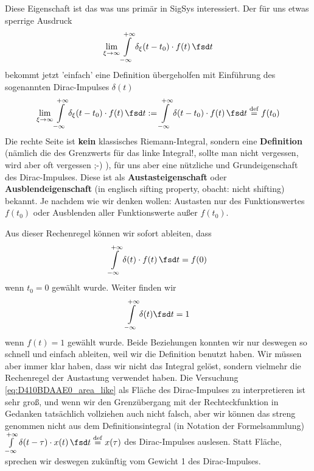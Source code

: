 \begin{Werkzeug}
%
Diese Eigenschaft ist das was uns primär in SigSys interessiert.
%
Der für uns etwas sperrige Ausdruck
\begin{equation}
\lim_{\xi\to\infty} \int\limits_{-\infty}^{+\infty}
\delta_\xi(t-t_0) \cdot f(t) \, \fsd t
\end{equation}
bekommt jetzt 'einfach' eine Definition übergeholfen mit
Einführung des sogenannten Dirac-Impulses $\delta(t)$
\begin{equation}
\label{eq:DiracDistrDef}
\lim_{\xi\to\infty} \int\limits_{-\infty}^{+\infty}
\delta_\xi(t-t_0) \cdot f(t) \, \fsd t
:= \int\limits_{-\infty}^{+\infty} \delta(t-t_0) \cdot f(t) \, \fsd t \stackrel{\mathrm{def}}= f(t_0)
\end{equation}
%
Die rechte Seite ist \textbf{kein} klassisches Riemann-Integral, sondern eine
\textbf{Definition} (nämlich die des Grenzwerts für das linke Integral!,
sollte man nicht vergessen, wird aber oft vergessen ;-) ),
für uns aber eine nützliche  und Grundeigenschaft des
Dirac-Impulses. Diese ist als \textbf{Austasteigenschaft} oder
\textbf{Ausblendeigenschaft} (in englisch sifting property, obacht: nicht shifting)
bekannt. Je nachdem wie wir denken wollen:
Austasten nur des Funktionswertes $f(t_0)$ oder Ausblenden aller Funktionswerte
außer $f(t_0)$.

Aus dieser Rechenregel können wir sofort ableiten, dass
\begin{equation}
\label{}
\int\limits_{-\infty}^{+\infty} \delta(t) \cdot f(t) \, \fsd t = f(0)
\end{equation}
wenn $t_0=0$ gewählt wurde.
%
Weiter finden wir
\begin{equation}
\label{eq:D410BDAAE0_area_like}
\int\limits_{-\infty}^{+\infty} \delta(t) \fsd t = 1
\end{equation}
wenn $f(t)=1$ gewählt wurde.
%
Beide Beziehungen konnten wir nur deswegen so schnell und einfach ableiten, weil
wir die Definition benutzt haben. Wir müssen aber immer klar haben, dass wir
nicht das Integral gelöst, sondern vielmehr die Rechenregel der Austastung
verwendet haben.
%
Die Versuchung \eqref{eq:D410BDAAE0_area_like} als Fläche
des Dirac-Impulses zu interpretieren
ist sehr groß, und wenn wir den Grenzübergang mit der Rechteckfunktion in Gedanken
tatsächlich vollziehen auch nicht falsch, aber wir können das streng genommen
nicht aus dem Definitionsintegral (in Notation der Formelsammlung)
$\int\limits_{-\infty}^{+\infty} \delta(t-\tau) \cdot x(t) \, \fsd t \stackrel{\mathrm{def}}= x(\tau)$
des Dirac-Impulses auslesen.
%
Statt Fläche, sprechen wir deswegen zukünftig vom Gewicht 1 des Dirac-Impulses.

\end{Werkzeug}

